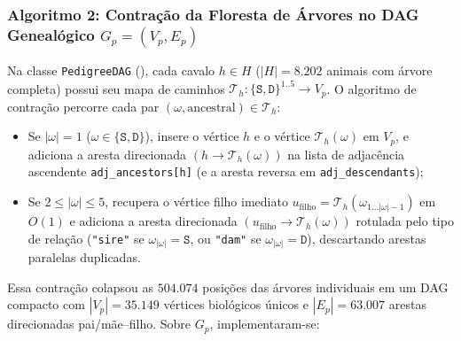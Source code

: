 \documentclass[conference]{IEEEtran}
\begin{document}
\subsubsection{Algoritmo 2: Contração da Floresta de Árvores no DAG Genealógico $G_p = (V_p, E_p)$}
Na classe \texttt{PedigreeDAG} (), cada cavalo $h \in H$ ($|H| = 8.202$ animais com árvore completa) possui seu mapa de caminhos $\mathcal{T}_h: \{\texttt{S}, \texttt{D}\}^{1..5} \to V_p$. O algoritmo de contração percorre cada par $(\omega, \text{ancestral}) \in \mathcal{T}_h$:
\begin{itemize}
    \item Se $|\omega| = 1$ ($\omega \in \{\texttt{S}, \texttt{D}\}$), insere o vértice $h$ e o vértice $\mathcal{T}_h(\omega)$ em $V_p$, e adiciona a aresta direcionada $(h \to \mathcal{T}_h(\omega))$ na lista de adjacência ascendente \texttt{adj\_ancestors[h]} (e a aresta reversa em \texttt{adj\_descendants});
    \item Se $2 \le |\omega| \le 5$, recupera o vértice filho imediato $u_{\text{filho}} = \mathcal{T}_h(\omega_{1 \dots |\omega|-1})$ em $O(1)$ e adiciona a aresta direcionada $(u_{\text{filho}} \to \mathcal{T}_h(\omega))$ rotulada pelo tipo de relação (\texttt{"sire"} se $\omega_{|\omega|} = \texttt{S}$, ou \texttt{"dam"} se $\omega_{|\omega|} = \texttt{D}$), descartando arestas paralelas duplicadas.
\end{itemize}
Essa contração colapsou as $504.074$ posições das árvores individuais em um DAG compacto com $|V_p| = 35.149$ vértices biológicos únicos e $|E_p| = 63.007$ arestas direcionadas pai/mãe--filho. Sobre $G_p$, implementaram-se:
\end{document}
